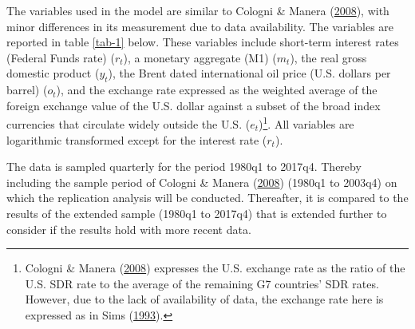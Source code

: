\documentclass[11pt,preprint, authoryear]{elsarticle}
\numberwithin{equation}{section}
\numberwithin{figure}{section}
\numberwithin{table}{section}
\let\rmarkdownfootnote\footnote%
\def\footnote{\protect\rmarkdownfootnote}
\begin{document}
The variables used in the model are similar to Cologni \& Manera
(\protect\hyperlink{ref-cologni2008}{2008}), with minor differences in
its measurement due to data availability. The variables are reported in
table \ref{tab-1} below. These variables include short-term interest
rates (Federal Funds rate) (\(r_t\)), a monetary aggregate (M1)
(\(m_t\)), the real gross domestic product (\(y_t\)), the Brent dated
international oil price (U.S. dollars per barrel) (\(o_t\)), and the
exchange rate expressed as the weighted average of the foreign exchange
value of the U.S. dollar against a subset of the broad index currencies
that circulate widely outside the U.S. (\(e_t\))\footnote{Cologni \&
  Manera (\protect\hyperlink{ref-cologni2008}{2008}) expresses the U.S.
  exchange rate as the ratio of the U.S. SDR rate to the average of the
  remaining G7 countries' SDR rates. However, due to the lack of
  availability of data, the exchange rate here is expressed as in Sims
  (\protect\hyperlink{ref-sims1993}{1993}).}. All variables are
logarithmic transformed except for the interest rate (\(r_t\)).

The data is sampled quarterly for the period 1980q1 to 2017q4. Thereby
including the sample period of Cologni \& Manera
(\protect\hyperlink{ref-cologni2008}{2008}) (1980q1 to 2003q4) on which
the replication analysis will be conducted. Thereafter, it is compared
to the results of the extended sample (1980q1 to 2017q4) that is
extended further to consider if the results hold with more recent data.

\appto\TPTdoTablenotes{\footnotesize}
\end{document}
